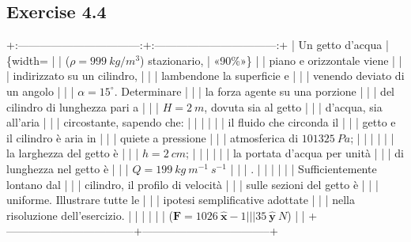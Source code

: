\documentclass[letterpaper,10pt,italian]{jupyterBook}
\begin{document}
\subsection{Exercise 4.4}
\label{\detokenize{polimi/fluidmechanics-ita/template/capitoli/04_bilanci/0402in:exercise-4-4}}\label{\detokenize{polimi/fluidmechanics-ita/template/capitoli/04_bilanci/0402in:fluid-mechanics-balances-ex-04}}\label{\detokenize{polimi/fluidmechanics-ita/template/capitoli/04_bilanci/0402in::doc}}
\sphinxAtStartPar
+:———————————:+:———————————:+
| Un getto d’acqua                  | \{width= |
| (\(\rho=999\ kg/m^3\)) stazionario, | «90\%»\}                            |
| piano e orizzontale viene         |                                   |
| indirizzato su un cilindro,       |                                   |
| lambendone la superficie e        |                                   |
| venendo deviato di un angolo      |                                   |
| \(\alpha =15^\circ\). Determinare   |                                   |
| la forza agente su una porzione   |                                   |
| del cilindro di lunghezza pari a  |                                   |
| \(H = 2\ m\), dovuta sia al getto   |                                   |
| d’acqua, sia all’aria             |                                   |
| circostante, sapendo che:         |                                   |
|                                   |                                   |
| \sphinxhyphen{}   il fluido che circonda il     |                                   |
|     getto e il cilindro è aria in |                                   |
|     quiete a pressione            |                                   |
|     atmosferica di \(101325\ Pa\);  |                                   |
|                                   |                                   |
| \sphinxhyphen{}   la larghezza del getto è      |                                   |
|     \(h=2\ cm\);                    |                                   |
|                                   |                                   |
| \sphinxhyphen{}   la portata d’acqua per unità  |                                   |
|     di lunghezza nel getto è      |                                   |
|     \(Q = 199\ kg\ m^{-1}\ s^{-1}\) |                                   |
| .                                 |                                   |
|                                   |                                   |
| Sufficientemente lontano dal      |                                   |
| cilindro, il profilo di velocità  |                                   |
| sulle sezioni del getto è         |                                   |
| uniforme. Illustrare tutte le     |                                   |
| ipotesi semplificative adottate   |                                   |
| nella risoluzione dell’esercizio. |                                   |
|                                   |                                   |
| (\(\bm{F} = 1026\ \hat{\bm{x}} - 1 |                                   |
| 35\ \hat{\bm{y}} \ N\))            |                                   |
+———————————–+———————————–+
\end{document}
